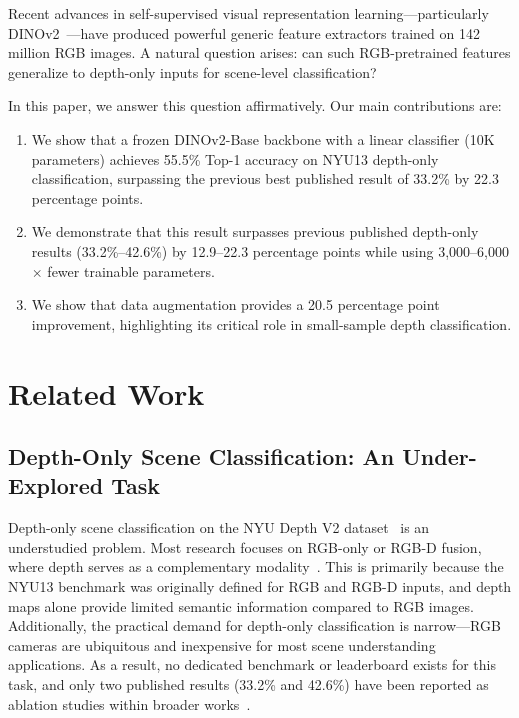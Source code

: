 \documentclass[conference, a4paper]{IEEEtran}
\begin{document}
Recent advances in self-supervised visual representation learning---particularly
DINOv2~\cite{dinov2}---have produced powerful generic feature extractors trained on
142 million RGB images. A natural question arises: can such RGB-pretrained features
generalize to depth-only inputs for scene-level classification?

In this paper, we answer this question affirmatively.
Our main contributions are:

\begin{enumerate}
    \item We show that a frozen DINOv2-Base backbone with a linear classifier (10K parameters)
          achieves 55.5\% Top-1 accuracy on NYU13 depth-only classification,
          surpassing the previous best published result of 33.2\% by 22.3 percentage points.
    \item We demonstrate that this result surpasses previous published depth-only
          results (33.2\%--42.6\%) by 12.9--22.3 percentage points while using
          3,000--6,000$\times$ fewer trainable parameters.
    \item We show that data augmentation provides a 20.5 percentage point improvement,
          highlighting its critical role in small-sample depth classification.
\end{enumerate}

\section{Related Work}

\subsection{Depth-Only Scene Classification: An Under-Explored Task}

Depth-only scene classification on the NYU Depth V2 dataset~\cite{nyu_depth} is an understudied
problem. Most research focuses on RGB-only or RGB-D fusion, where depth serves as a complementary
modality~\cite{gupta2014indoor}. This is primarily because the NYU13 benchmark was originally
defined for RGB and RGB-D inputs, and depth maps alone provide limited semantic information
compared to RGB images. Additionally, the practical demand for depth-only classification is
narrow---RGB cameras are ubiquitous and inexpensive for most scene understanding applications.
As a result, no dedicated benchmark or leaderboard exists for this task, and only two published
results (33.2\% and 42.6\%) have been reported as ablation studies within broader works~\cite{wang3d, hoffman2016}.
\end{document}
